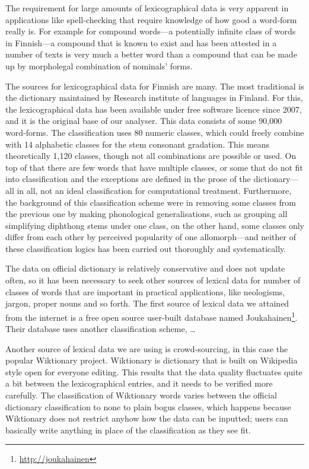 \documentclass[a4paper,12pt]{article}
\begin{document}
The requirement for large amounts of lexicographical data is very apparent in
applications like spell-checking that require knowledge of how good a word-form
really is. For example for compound words---a potentially infinite class of
words in Finnish---a compound that is known to exist and has been attested in
a number of texts is very much a better word than a compound that can be made
up by morpholegal combination of nominals' forms.

The sources for lexicographical data for Finnish are many. The most traditional
is the dictionary maintained by Research institute of languages in Finland. For
this, the lexicographical data has been available under free software licence
since 2007, and it is the original base of our analyser. This data consists of
some 90,000 word-forms. The classification uses 80 numeric classes, which could
freely combine with 14 alphabetic classes for the stem consonant gradation.
This means theoretically 1,120 classes, though not all combinations are possible
or used. On top of that there are few words that have multiple classes, or some
that do not fit into classification and the exceptions are defined in the prose
of the dictionary---all in all, not an ideal classification for computational
treatment. Furthermore, the background of this classification scheme were in
removing some classes from the previous one by making phonological
generalisations, such as grouping all simplifying diphthong stems under one
class, on the other hand, some classes only differ from each other by perceived
popularity of one allomorph---and neither of these classification logics has
been carried out thoroughly and systematically.

The data on official dictionary is relatively conservative and does not update
often, so it has been necessary to seek other sources of lexical data for number
of classes of words that are important in practical applications, like
neologisms, jargon, proper nouns and so forth. The first source of lexical data
we attained from the internet is a free open source user-built database named
Joukahainen\footnote{\url{http://joukahainen}}. Their database uses another
classification scheme, \ldots

Another source of lexical data we are using is crowd-sourcing, in this case the
popular Wiktionary project. Wiktionary is dictionary that is built on Wikipedia
style open for everyone editing. This results that the data quality fluctuates
quite a bit between the lexicographical entries, and it needs to be verified
more carefully. The classification of Wiktionary words varies between the
official dictionary classification to none to plain bogus classes, which happens
because Wiktionary does not restrict anyhow how the data can be inputted; users
can basically write anything in place of the classification as they see fit.
\end{document}

